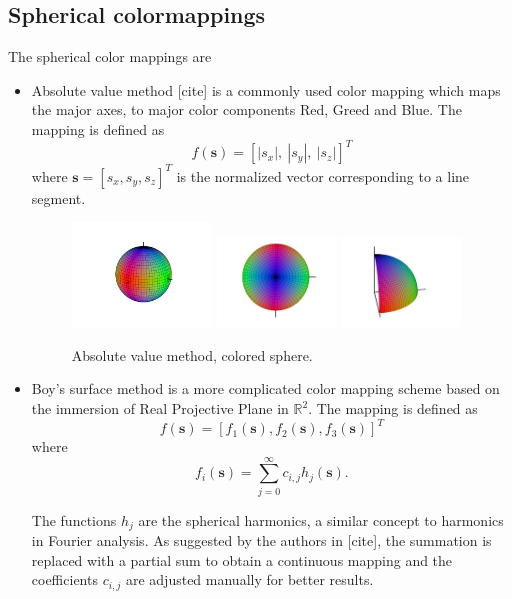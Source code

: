\documentclass[a4paper, 12pt]{report}
\begin{document}
\subsection*{Spherical colormappings}
The spherical color mappings are
\begin{itemize}
	\item Absolute value method [cite] is a commonly used color mapping which maps the major axes, to major color components Red, Greed and Blue. The mapping is defined as 
	\begin{equation}
		f(\mathbf{s})=[|s_x|, \ |s_y|, \ |s_z|]^T
	\end{equation}
	where $\mathbf{s}=[s_x ,s_y, s_z]^T$ is the normalized vector corresponding to a line segment.  
	\begin{figure}
		\centering
		\includegraphics[width=0.35\textwidth]{absolute}
		\includegraphics[width=0.3\textwidth]{absolute_top}
		\includegraphics[width=0.3\textwidth]{absolute_octant}
		\caption{Absolute value method, colored sphere.}
	\end{figure}
	
	\item Boy's surface method is a more complicated color mapping scheme based on the immersion of Real Projective Plane in $\mathbb{R}^2$. The mapping is defined as 
	\begin{equation}
		f(\mathbf{s})=[f_1(\mathbf{s}), f_2(\mathbf{s}), f_3(\mathbf{s})]^T
	\end{equation}
	where 
	\begin{equation}
		f_i(\mathbf{s})=\sum_{j=0}^{\infty} c_{i,j} h_j(\mathbf{s}).
	\end{equation}
	
The functions $h_j$ are the spherical harmonics, a similar concept to harmonics in Fourier analysis. As suggested by the authors in [cite], the summation is replaced with a partial sum to obtain a continuous mapping and the coefficients $c_{i,j}$ are adjusted manually for better results. 
\end{itemize}
\end{document}
